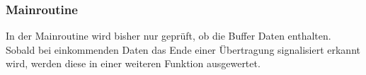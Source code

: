 %





\subsubsection{Mainroutine}\label{subsubsec:Mainroutine}

In der Mainroutine wird bisher nur geprüft, ob die Buffer Daten enthalten. Sobald bei einkommenden Daten das Ende einer Übertragung signalisiert erkannt wird, werden diese in einer weiteren Funktion ausgewertet.

